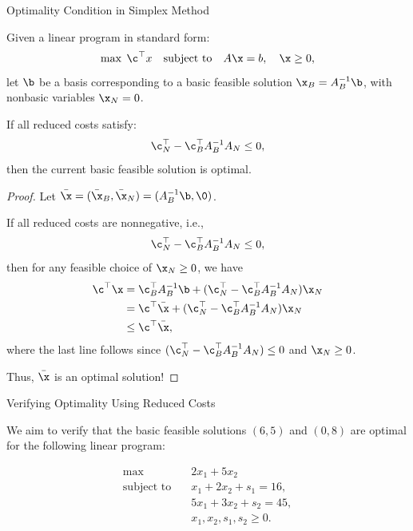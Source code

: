 \begin{theorem}{Optimality Condition in Simplex Method}{}{}

    Given a linear program in standard form:
    \[
    \max \; \c^\top x \quad \text{subject to} \quad A \x = b, \quad \x \geq 0,
    \]
    let \(\b\) be a basis corresponding to a basic feasible solution \( \x_B = A_B^{-1}\b\), with nonbasic variables \( \x_N = 0 \). 

    If all reduced costs satisfy:
    \[
   \c_N^\top -\c_B^\top A_B^{-1} A_N \leq 0,
    \]
    then the current basic feasible solution is optimal.
\end{theorem}
\begin{proof}
Let $\bar \x = (\bar \x_B, \bar \x_N) = (A_B^{-1}\b, \0)$.

    If all reduced costs are nonnegative, i.e.,
    \[
   \c_N^\top -\c_B^\top A_B^{-1} A_N \leq 0,
    \]
    then for any feasible choice of \( \x_N \geq 0 \), 
    we have
    \begin{align}
    \c^\top \x &= \c_B^\top A_B^{-1}\b+  (\c_N^\top -\c_B^\top A_B^{-1} A_N )\x_N\\
    &= \c^\top \bar \x +  (\c_N^\top -\c_B^\top A_B^{-1} A_N )\x_N\\
    & \leq \c^\top \bar \x,
    \end{align}
    where the last line follows since $(\c_N^\top -\c_B^\top A_B^{-1} A_N ) \leq 0$ and $\x_N \geq 0$.
    
    Thus, $\bar \x$ is an optimal solution!
\end{proof}


\begin{example}{Verifying Optimality Using Reduced Costs}{}{}

We aim to verify that the basic feasible solutions \( (6,5) \) and \( (0,8) \) are optimal for the following linear program:

\[
\begin{aligned}
    \max \quad & 2 x_1 + 5 x_2 \\
    \text{subject to} \quad 
    & x_1 + 2x_2 + s_1 = 16, \\
    & 5x_1 + 3x_2 + s_2 = 45, \\
    & x_1, x_2, s_1, s_2 \geq 0.
\end{aligned}
\]
\end{example}

